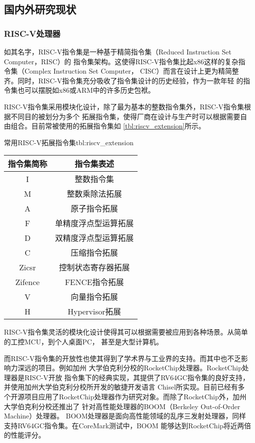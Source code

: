 \subsection{国内外研究现状}

\subsubsection{RISC-V处理器}

如其名字，RISC-V指令集是一种基于精简指令集（Reduced Instruction Set Computer，RISC）的
指令集架构。这使得RISC-V指令集比起x86这样的复杂指令集（Complex Instruction Set Computer，
CISC）而言在设计上更为精简整齐。同时，RISC-V指令集充分吸收了指令集设计的历史经验，作为一款年轻
的指令集也可以摆脱如x86或ARM中的许多历史包袱。

RISC-V指令集采用模块化设计，除了最为基本的整数指令集外，RISC-V指令集根据不同目的被划分为多个
拓展指令集，使得厂商在设计与生产时可以根据需要自由组合。目前常被使用的拓展指令集如
\autoref{tbl:riscv_extension}所示。

\begin{generaltab}{常用RISC-V拓展指令集}{tbl:riscv_extension}
  \begin{tabular}{cc}
    \toprule
    指令集简称 & 指令集表述 \\
    \midrule
    I & 整数指令集 \\
    M & 整数乘除法拓展 \\
    A & 原子指令拓展 \\
    F & 单精度浮点型运算拓展 \\
    D & 双精度浮点型运算拓展 \\
    C & 压缩指令拓展 \\
    Zicsr & 控制状态寄存器拓展 \\
    Zifence & FENCE指令拓展 \\
    V & 向量指令拓展 \\
    H & Hypervisor拓展 \\
    \bottomrule
  \end{tabular}
\end{generaltab}

RISC-V指令集灵活的模块化设计使得其可以根据需要被应用到各种场景。从简单的工控MCU，到个人桌面PC，
甚至是大型计算机。

而RISC-V指令集的开放性也使其得到了学术界与工业界的支持。而其中也不乏影响力深远的项目。例如加州
大学伯克利分校的RocketChip处理器\cite{asanovic2016rocket}。RocketChip处理器是RISC-V开放
指令集下的经典实现，其提供了RV64GC指令集的良好支持，并使用加州大学伯克利分校所开发的敏捷开发语言
Chisel所实现。目前已经有多个开源项目应用了RocketChip处理器作为研究对象\cite{rigge2018designing,
wang2021instruction,wei2020evaluation}。而除了RocketChip外，加州大学伯克利分校还推出了
针对高性能处理器的BOOM（Berkeley Out-of-Order Machine）处理器\cite{zhao2020sonicboom}。
BOOM处理器是面向高性能领域的乱序三发射处理器，同样支持RV64GC指令集。在CoreMark测试中，BOOM
能够达到RocketChip将近两倍的性能评分\cite{zhao2020sonicboom}。

